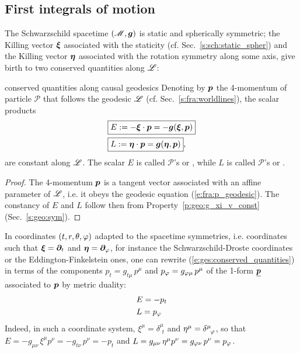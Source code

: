 \subsection{First integrals of motion} \label{s:ges:fiom}

The Schwarzschild spacetime $(\mathscr{M},\bm{g})$ is static and spherically symmetric; the
Killing vector $\bm{\xi}$ associated with the staticity (cf. Sec.~\ref{s:sch:static_spher})
and the Killing vector $\bm{\eta}$ associated with the rotation symmetry along some
axis, give birth to two conserved quantities along $\mathscr{L}$:
\begin{tprop}{conserved quantities along causal geodesics}{}
Denoting by $\bm{p}$ the 4-momentum of particle
$\mathscr{P}$ that follows the geodesic $\mathscr{L}$
(cf. Sec.~\ref{s:fra:worldlines}), the scalar products
\begin{subequations}
\label{e:ges:conserved_quantities}
\begin{align}
& \fbox{$\displaystyle E := - \bm{\xi}\cdot \bm{p} = - \bm{g}(\bm{\xi},\bm{p}) $} \label{e:ges:conserved_energy} \\
& \fbox{$\displaystyle L := \bm{\eta}\cdot \bm{p} = \bm{g}(\bm{\eta},\bm{p}) $} , \label{e:ges:conserved_angu_mom}
\end{align}
\end{subequations}
are constant along $\mathscr{L}$.
The scalar $E$ is called $\mathscr{P}$'s
or ,
while $L$ is called $\mathscr{P}$'s 
or .
\end{tprop}

\begin{proof}
The 4-momentum $\bm{p}$ is a tangent vector associated with an affine parameter
of $\mathscr{L}$, i.e. it obeys the geodesic equation (\ref{e:fra:p_geodesic}).
The constancy of $E$ and $L$ follow then from
Property~\ref{p:geo:g_xi_v_const} (Sec.~\ref{s:geo:sym}).
\end{proof}
In coordinates $(t,r,\theta,\varphi)$ adapted to the spacetime symmetries,
i.e. coordinates such that $\bm{\xi} = \bm{\partial}_t$ and $\bm{\eta}=\bm{\partial}_\varphi$,
for instance the Schwarzschild-Droste
coordinates or the Eddington-Finkelstein ones, one can rewrite
(\ref{e:ges:conserved_quantities})
in terms of the components $p_t = g_{t\mu} \, p^\mu$ and $p_\varphi = g_{\varphi\mu} \, p^\mu$
of the 1-form $\underline{\bm{p}}$ associated to $\bm{p}$ by metric duality:
\begin{subequations}
\begin{align}
& E = - p_t \\
& L = p_\varphi
\end{align}
\end{subequations}
Indeed, in such a coordinate system, $\xi^\mu =  \delta^\mu_{\ \, t}$
and $\eta^\mu = \delta^\mu_{\ \, \varphi}$, so that $E = -g_{\mu\nu} \, \xi^\mu p^\nu = -g_{t\nu} \, p^\nu = -p_t$
and $L = g_{\mu\nu} \, \eta^\mu p^\nu = g_{\varphi\nu} \, p^\nu = p_\varphi$.


